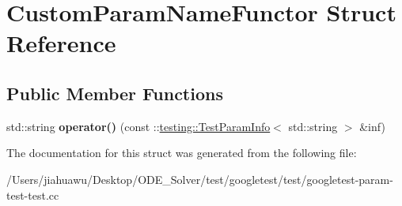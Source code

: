 \hypertarget{struct_custom_param_name_functor}{}\section{Custom\+Param\+Name\+Functor Struct Reference}
\label{struct_custom_param_name_functor}
\subsection*{Public Member Functions}
\begin{DoxyCompactItemize}
\item 
\mbox{\label{struct_custom_param_name_functor_a364d073efd6cb9a05e9d1c97565288ef}} 
std\+::string {\bfseries operator()} (const \+::\mbox{\hyperlink{structtesting_1_1_test_param_info}{testing\+::\+Test\+Param\+Info}}$<$ std\+::string $>$ \&inf)
\end{DoxyCompactItemize}


The documentation for this struct was generated from the following file\+:\begin{DoxyCompactItemize}
\item 
/\+Users/jiahuawu/\+Desktop/\+O\+D\+E\+\_\+\+Solver/test/googletest/test/googletest-\/param-\/test-\/test.\+cc\end{DoxyCompactItemize}
